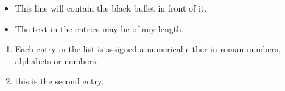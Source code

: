 \documentclass{article}
\begin{document}
\begin{itemize}
 \item This line will contain the black bullet in front of it.
 \item The text in the entries may be of any length.
\end{itemize}
\begin{enumerate}
\item Each entry in the list is assigned a numerical either in roman numbers, alphabets or numbers.
\item this is the second entry.
\end{enumerate}
\end{document}
